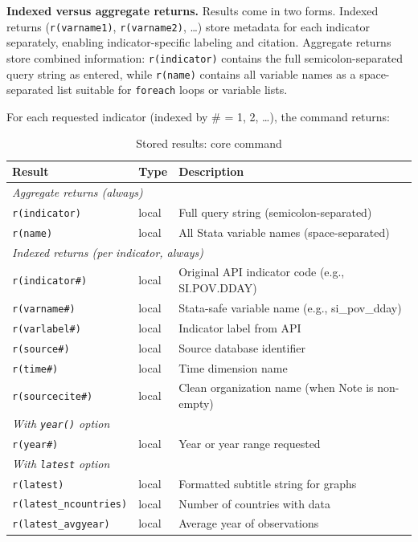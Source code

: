 \documentclass[bib]{statapress}
\begin{document}
\textbf{Indexed versus aggregate returns.} Results come in two forms. Indexed returns (\texttt{r(varname1)}, \texttt{r(varname2)}, \ldots) store metadata for each indicator separately, enabling indicator-specific labeling and citation. Aggregate returns store combined information: \texttt{r(indicator)} contains the full semicolon-separated query string as entered, while \texttt{r(name)} contains all variable names as a space-separated list suitable for \texttt{foreach} loops or variable lists.

For each requested indicator (indexed by \# = 1, 2, \ldots), the command returns:

\begin{table}[H]
\centering
\caption{Stored results: core command}
\label{tab:stored}
\begin{tabular}{llp{6.5cm}}
\hline
Result & Type & Description \\
\hline
\multicolumn{3}{l}{\textit{Aggregate returns (always)}} \\
\texttt{r(indicator)} & local & Full query string (semicolon-separated) \\
\texttt{r(name)} & local & All Stata variable names (space-separated) \\
\hline
\multicolumn{3}{l}{\textit{Indexed returns (per indicator, always)}} \\
\texttt{r(indicator\#)} & local & Original API indicator code (e.g., SI.POV.DDAY) \\
\texttt{r(varname\#)} & local & Stata-safe variable name (e.g., si\_pov\_dday) \\
\texttt{r(varlabel\#)} & local & Indicator label from API \\
\texttt{r(source\#)} & local & Source database identifier \\
\texttt{r(time\#)} & local & Time dimension name \\
\texttt{r(sourcecite\#)} & local & Clean organization name (when Note is non-empty) \\
\hline
\multicolumn{3}{l}{\textit{With \texttt{year()} option}} \\
\texttt{r(year\#)} & local & Year or year range requested \\
\hline
\multicolumn{3}{l}{\textit{With \texttt{latest} option}} \\
\texttt{r(latest)} & local & Formatted subtitle string for graphs \\
\texttt{r(latest\_ncountries)} & local & Number of countries with data \\
\texttt{r(latest\_avgyear)} & local & Average year of observations \\

\end{tabular}
\end{table}
\end{document}
